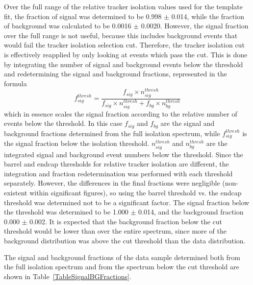 Over the full range of the relative tracker isolation 
values used for the template fit, 
the fraction of signal was determined to be 
0.998 $\pm$ 0.014, 
while the fraction of background was calculated to be 
0.0016 $\pm$ 0.0020.  
However, the signal fraction over the full 
range is not useful, because this includes 
background events that would fail 
the tracker isolation selection cut.  
Therefore, the tracker isolation cut is effectively 
reapplied by only looking at events which 
pass the cut.  
This is done by integrating 
the number of signal and background events 
below the threshold and redetermining the 
signal and background fractions, %
represented in the formula 
\[
f_{sig}^{thresh} = \frac{ f_{sig} \times n_{sig}^{thresh} }{ f_{sig} \times n_{sig}^{thresh} + f_{bg} \times n_{bg}^{thresh} }
\]
which in essence scales the signal fraction 
according to the relative number of events 
below the threshold.  
In this case $f_{sig}$ and $f_{bg}$ are the 
signal and background fractions determined 
from the full isolation spectrum, 
while $f_{sig}^{thresh}$ is the signal fraction 
below the isolation threshold.  
$n_{sig}^{thresh}$ and $n_{bg}^{thresh}$ are the 
integrated signal and background event numbers 
below the threshold.  
Since the barrel and endcap thresholds 
for relative tracker isolation are different, 
the integration and fraction 
redetermination was performed with each 
threshold separately.  
However, the differences in the final fractions 
were negligible (non-existent within significant figures), 
so using the barrel threshold vs. the endcap threshold 
was determined not to be a significant factor.  
The signal fraction below the threshold was determined 
to be 1.000 $\pm$ 0.014, and the background fraction 
0.000 $\pm$ 0.002.  
It is expected that the background fraction below 
the cut threshold would be lower than over the 
entire spectrum, 
since more of the background distribution 
was above the cut threshold than the data distribution.  

The signal and background fractions of the data sample 
determined both from the full isolation spectrum and 
from the spectrum below the cut threshold are shown in 
Table~\ref{TableSignalBGFractions}.  

